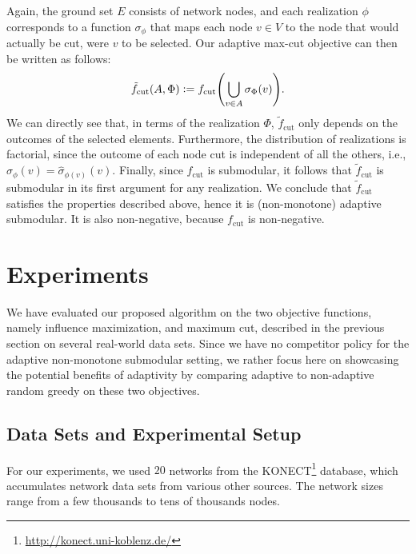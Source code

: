 \documentclass{article}
\newcommand{\defeq}{\vcentcolon=}
\let\originalleft\left
\let\originalright\right
\renewcommand{\left}{\mathopen{}\mathclose\bgroup\originalleft}
\renewcommand{\right}{\aftergroup\egroup\originalright}
\begin{document}
Again, the ground set $E$ consists of network nodes, and each realization $\phi$ corresponds to a function $\sigma_{\phi}$ that maps each node $v \in V$ to the node that would actually be cut, were $v$ to be selected.
Our adaptive max-cut objective can then be written as follows:
\begin{align*}
  \tilde{f}_{\textrm{cut}}(A, \Phi) \defeq f_{\textrm{cut}}\left(\bigcup_{v \in A}\sigma_{\Phi}(v)\right).
\end{align*}
We can directly see that, in terms of the realization $\Phi$, $\tilde{f}_{\textrm{cut}}$ only depends on the outcomes of the selected elements.
Furthermore, the distribution of realizations is factorial, since the outcome of each node cut is independent of all the others, i.e., $\sigma_{\phi}(v) = \hat{\sigma}_{\phi(v)}(v)$.
Finally, since $f_{\textrm{cut}}$ is submodular, it follows that $\tilde{f}_{\textrm{cut}}$ is submodular in its first argument for any realization.
We conclude that $\tilde{f}_{\textrm{cut}}$ satisfies the properties described above, hence it is (non-monotone) adaptive submodular.
It is also non-negative, because $f_{\textrm{cut}}$ is non-negative.

\section{Experiments}
We have evaluated our proposed algorithm on the two objective functions, namely influence maximization, and maximum cut, described in the previous section on several real-world data sets.
Since we have no competitor policy for the adaptive non-monotone submodular setting, we rather focus here on showcasing the potential benefits of adaptivity by comparing adaptive to non-adaptive random greedy on these two objectives.

\subsection{Data Sets and Experimental Setup}
For our experiments, we used $20$ networks from the KONECT\footnote{\url{http://konect.uni-koblenz.de/}} database, which accumulates network data sets from various other sources.
The network sizes range from a few thousands to tens of thousands nodes.
\end{document}

